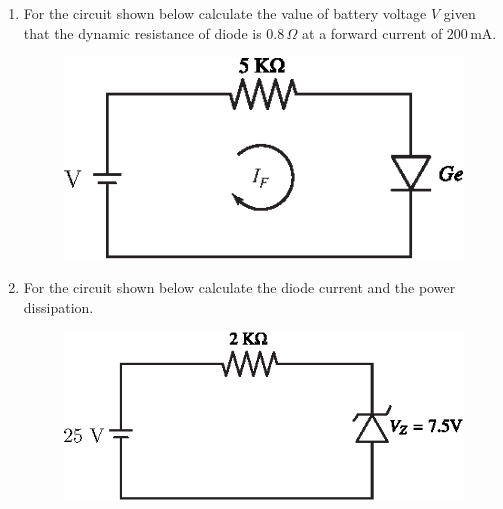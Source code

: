 \begin{enumerate}
\item For the circuit shown below calculate the value of battery voltage $V$ given that the dynamic resistance of diode is 0.8\,$\Omega$ at a forward current of 200\,mA.
\begin{figure}[H]
\centering
\includegraphics{addfig/exr1.5.eps}
\end{figure}

\item For the circuit shown below calculate the diode current and the power dissipation.
\begin{figure}[H]
\centering
\includegraphics{addfig/exr1.6.eps}
\end{figure}
\end{enumerate}

